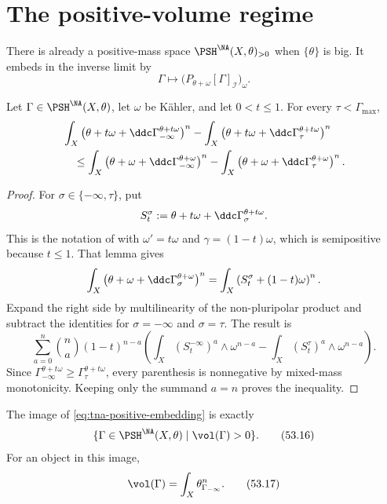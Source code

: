 \section{The positive-volume regime}
\label{sec:tna-positive-volume}

There is already a positive-mass space
$\PSH^{\NA}(X,\theta)_{>0}$ when $\{\theta\}$ is big.  It embeds in
the inverse limit by
\[
 \Gamma\longmapsto
 \bigl(P_{\theta+\omega}[\Gamma]_{\mathcal I}\bigr)_\omega .
\tag{53.15}\label{eq:tna-positive-embedding}
\]

\begin{lemma}\label{lem:tna-mass-drop-transition}
Let $\Gamma\in\PSH^{\NA}(X,\theta)$, let $\omega$ be K\"ahler, and
let $0<t\leq1$.  For every $\tau<\Gamma_{\max}$,
\[
\begin{aligned}
&\int_X\left(\theta+t\omega+
       \ddc\Gamma_{-\infty}^{\theta+t\omega}\right)^n
 -\int_X\left(\theta+t\omega+
       \ddc\Gamma_{\tau}^{\theta+t\omega}\right)^n\\
&\quad\leq
\int_X\left(\theta+\omega+
       \ddc\Gamma_{-\infty}^{\theta+\omega}\right)^n
 -\int_X\left(\theta+\omega+
       \ddc\Gamma_{\tau}^{\theta+\omega}\right)^n .
\end{aligned}
\]
\end{lemma}

\begin{proof}
For $\sigma\in\{-\infty,\tau\}$, put
\[
 S_t^\sigma
 :=\theta+t\omega+\ddc\Gamma_\sigma^{\theta+t\omega}.
\]
This is the notation of
 with $\omega'=t\omega$ and
$\gamma=(1-t)\omega$, which is semipositive because $t\leq1$.  That
lemma gives
\[
 \int_X\left(\theta+\omega+
       \ddc\Gamma_\sigma^{\theta+\omega}\right)^n
 =\int_X\left(S_t^\sigma+(1-t)\omega\right)^n.
\]
Expand the right side by multilinearity of the non-pluripolar product and
subtract the identities for $\sigma=-\infty$ and $\sigma=\tau$.  The
result is
\[
\sum_{a=0}^n\binom na(1-t)^{n-a}
\left(
 \int_X(S_t^{-\infty})^a\wedge\omega^{n-a}
 -\int_X(S_t^\tau)^a\wedge\omega^{n-a}
\right).
\]
Since
$\Gamma_{-\infty}^{\theta+t\omega}
 \geq\Gamma_\tau^{\theta+t\omega}$, every parenthesis is nonnegative by
mixed-mass monotonicity.  Keeping only the summand $a=n$ proves the
inequality.
\end{proof}

\begin{theorem}\label{thm:tna-positive-volume}
The image of \eqref{eq:tna-positive-embedding} is exactly
\[
       \{\Gamma\in\PSH^{\NA}(X,\theta)\mid\vol(\Gamma)>0\}.
\tag{53.16}\label{eq:tna-positive-volume-locus}
\]
For an object in this image,
\[
                 \vol(\Gamma)
                 =\int_X\theta_{\Gamma_{-\infty}}^n.
\tag{53.17}\label{eq:tna-positive-volume-formula}
\]
\end{theorem}


